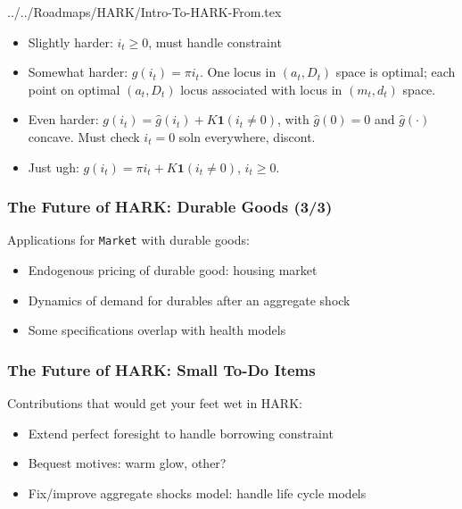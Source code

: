 \documentclass[public]{beamer}\beamerdefaultoverlayspecification{<+->}
\begin{document}
\begin{verbatimwrite}{../../Roadmaps/HARK/Intro-To-HARK-From.tex}
\begin{frame}
\begin{itemize}
    \item <1->Slightly harder: $i_t \geq 0$, must handle constraint

    \item <2->Somewhat harder: $g(i_t) = \pi i_t$.  One locus in $(a_t,D_t)$ space is optimal; each point on optimal $(a_t,D_t)$ locus associated with locus in $(m_t,d_t)$ space.

    \item <3->Even harder: $g(i_t) = \widehat{g}(i_t) + K \mathbf{1}(i_t \neq 0)$, with $\widehat{g}(0) = 0$ and $\widehat{g}(\cdot)$ concave.  Must check $i_t=0$ soln everywhere, discont.

    \item <4->Just ugh: $g(i_t) = \pi i_t +K \mathbf{1}(i_t \neq 0)$, $i_t \geq 0$.
    \end{itemize}
  \end{frame}


  \begin{frame}
    \frametitle{The Future of HARK: Durable Goods (3/3)}
    Applications for \texttt{Market} with durable goods:
    \begin{itemize}
    \item Endogenous pricing of durable good: housing market

    \item Dynamics of demand for durables after an aggregate shock

    \item Some specifications overlap with health models
    \end{itemize}

    \hyperlink{DiscussionTopics}{}
  \end{frame}



  \begin{frame}\label{StructuralChanges}
    \frametitle{The Future of HARK: Small To-Do Items}
    Contributions that would get your feet wet in HARK:
    \begin{itemize}
    \item <1->Extend perfect foresight to handle borrowing constraint

    \item <1->Bequest motives: warm glow, other?

    \item <2->Fix/improve aggregate shocks model: handle life cycle models


\end{itemize}
\end{frame}
\end{verbatimwrite}
\end{document}
